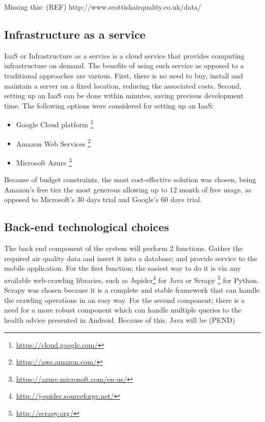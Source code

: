Missing this: (REF)
http://www.scottishairquality.co.uk/data/

\subsection{Infrastructure as a service}
IaaS or Infrastructure as a service is a cloud service that provides computing infrastructure on demand. The benefits of using such service as opposed to a traditional approaches are various. First, there is no need to buy, install and maintain a server on a fixed location, reducing the associated costs. Second, setting up an IaaS can be done within minutes, saving precious development time. The following options were considered for setting up an IaaS: 

\begin{itemize}
	\item Google Cloud platform \footnote{\url{https://cloud.google.com/}}
    \item Amazon Web Services \footnote{\url{https://aws.amazon.com/}}
    \item Microsoft Azure \footnote{\url{https://azure.microsoft.com/en-us/}}
\end{itemize}

Because of budget constraints, the most cost-effective solution was chosen, being Amazon's free tier the most generous allowing up to 12 month of free usage, as opposed to Microsoft's 30 days trial and Google's 60 days trial.

\subsection{Back-end technological choices}
The back end component of the system will perform 2 functions. Gather the required air quality data and insert it into a database; and provide service to the mobile application. For the  first function; the easiest way to do it is via any available web-crawling libraries, such as Jspider\footnote{\url{http://j-spider.sourceforge.net/}} for Java or Scrapy \footnote{\url{http://scrapy.org/}} for Python. Scrapy was chosen because it is a complete and stable framework that can handle the crawling operations in an easy way. 
For the second component; there is a need for a more robust component which can handle multiple queries to the health advice presented in Android. Because of this, Java will be (PEND)

